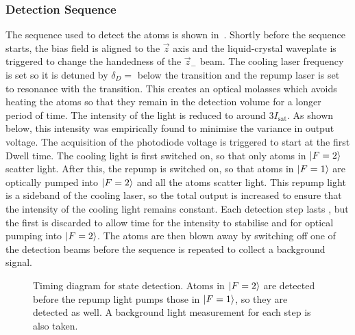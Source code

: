 \subsubsection{Detection Sequence}\label{subsec:detection_sequence}
The sequence used to detect the atoms is shown
in~. Shortly before the sequence starts, the
bias field is aligned to the \(\vec{z}\) axis and the liquid-crystal
waveplate is triggered to change the handedness of the \(\vec{z}_-\)
beam. The cooling laser frequency is set so it is detuned by
\(\delta_D =\) 
below the  transition and the repump laser is set to
resonance with the  transition. This creates an optical
molasses which avoids heating the atoms so that they remain in the
detection volume for a longer period of time. The intensity of the
light is reduced to around \(3 I_\text{sat}\). As shown below, this
intensity was empirically found to minimise the variance in output
voltage. The acquisition of the photodiode voltage is
triggered to start at the first Dwell time. The cooling light is first
switched on, so that only atoms in \(\ket{F=2}\) scatter light. After this, the repump
is switched on, so that atoms in \(\ket{F=1}\) are optically pumped
into \(\ket{F=2}\) and all the atoms scatter light. This repump light is a
sideband of the cooling laser, so the total output is increased
to ensure that the intensity of the cooling light remains constant.
Each detection step lasts , but the
first  is discarded to allow time for the
intensity to stabilise and for optical pumping into \(\ket{F=2}\).
The atoms are then blown away by switching off one of the detection
beams before the sequence is repeated to collect a
background signal.
\begin{figure}[!htbp] 
  \centering
  \fontsize{14pt}{14pt}
  \resizebox{0.8\textwidth}{!}{} 
  \caption[State detection sequence timing]{Timing diagram for state
  detection. Atoms in \(\ket{F=2}\) are detected before the repump
light pumps those in \(\ket{F=1}\), so they are detected as well. A
background light measurement for each step is also taken.}
	\label{fig:detection} 
\end{figure}

